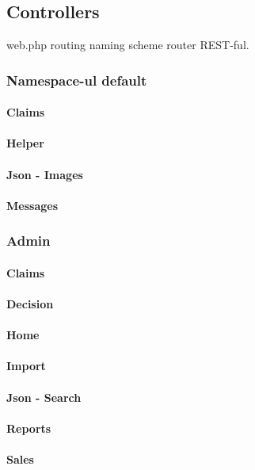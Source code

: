 \subsection{Controllers}
		web.php routing
		naming scheme
		router REST-ful.
		\subsubsection{Namespace-ul default}
			\paragraph{Claims} 
			\paragraph{Helper} 
			\paragraph{Json - Images} 
			\paragraph{Messages}
		\subsubsection{Admin}
			\paragraph{Claims}
			\paragraph{Decision}
			\paragraph{Home}
			\paragraph{Import}
			\paragraph{Json - Search}
			\paragraph{Reports}
			\paragraph{Sales}
